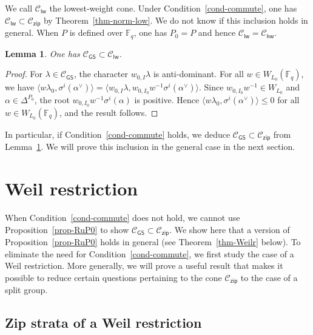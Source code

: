 \documentclass[11pt]{amsart}
\numberwithin{equation}{section}
\newtheorem{lemma}[theorem]{Lemma}
\theoremstyle{definition}
\theoremstyle{remark}
\newcommand{\zipsf}{\mathsf{zip}}
\newcommand{\GSsf}{\mathsf{GS}}
\newcommand{\lwsf}{\mathsf{lw}}
\newcommand{\hwsf}{\mathsf{hw}}
\newcommand{\Ccal}{{\mathcal C}}
\newcommand{\FF}{\mathbb{F}}
\begin{document}
We call $\Ccal_{\lwsf}$ the lowest-weight cone. Under Condition~\ref{cond-commute}, one has $\Ccal_{\lwsf}\subset \Ccal_{\zipsf}$ by Theorem~\ref{thm-norm-low}. We do not know if this inclusion holds in general. When $P$ is defined over $\FF_q$, one has $P_0=P$ and hence $\Ccal_{\lwsf}=\Ccal_{\hwsf}$.

\begin{lemma}\label{cor-CGS-Cond}
One has $\Ccal_{\GSsf}\subset  \Ccal_{\lwsf}$. 
\end{lemma}

\begin{proof}
For $\lambda \in \Ccal_{\GSsf}$, the character $w_{0,I}\lambda$ is anti-dominant. For all $w\in W_{L_0}(\FF_q)$, we have $\langle w \lambda_0, \sigma^i(\alpha^\vee) \rangle = \langle  w_{0,I}\lambda, w_{0,I_0} w^{-1}\sigma^i(\alpha^\vee) \rangle$. Since $w_{0,I_0} w^{-1}\in W_{L_0}$ and $\alpha \in \Delta^{P_0}$, the root $w_{0,I_0} w^{-1}\sigma^i(\alpha)$ is positive. Hence $\langle w \lambda_0, \sigma^i(\alpha^\vee) \rangle \leq 0$ for all $w\in W_{L_0}(\FF_q)$, and the result follows.
\end{proof}

In particular, if Condition~\ref{cond-commute} holds, we deduce $\Ccal_{\GSsf}\subset \Ccal_{\zipsf}$ from Lemma~\ref{cor-CGS-Cond}. We will prove this inclusion in the general case in the next section.

\section{Weil restriction}\label{sec-Weil}

When Condition~\ref{cond-commute} does not hold, we cannot use Proposition~\ref{prop-RuP0} to show $\Ccal_{\GSsf}\subset \Ccal_{\zipsf}$. We show here that a version of Proposition~\ref{prop-RuP0} holds in general (see Theorem~\ref{thm-Weilr} below). To eliminate the need for Condition~\ref{cond-commute}, we first study the case of a Weil restriction. More generally, we will prove a useful result that makes it possible to reduce certain questions pertaining to the cone $\Ccal_{\zipsf}$ to the case of a split group.

\subsection{Zip strata of a Weil restriction}
\end{document}
